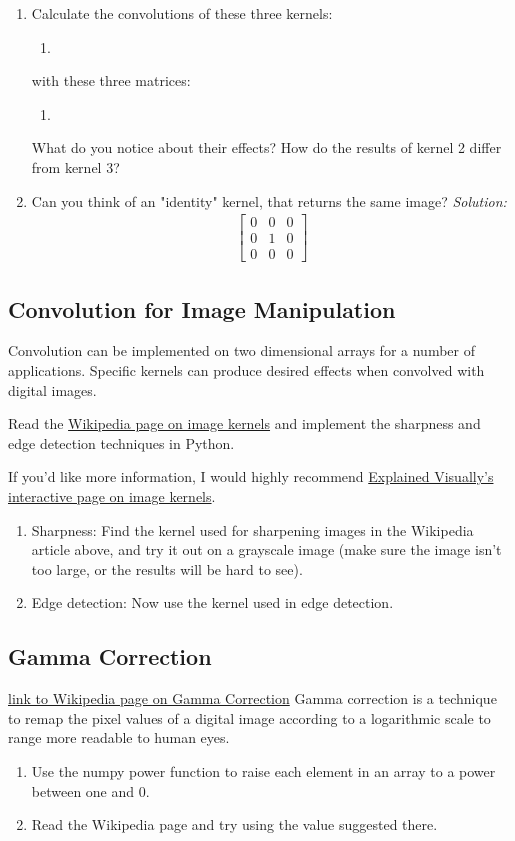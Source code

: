 \documentclass{tufte-handout}
\newcommand{\threebythree}[9]{\ensuremath{\begin{bmatrix} #1 & #2 & #3 \\ #4 & #5 & #6 \\ #7 & #8 & #9 \end{bmatrix}}}
\begin{document}
\begin{enumerate}
\item Calculate the convolutions of these three kernels:
    \begin{enumerate}
        \item
    \end{enumerate}
    with these three matrices:
    \begin{enumerate}
        \item
    \end{enumerate}
    What do you notice about their effects? How do the results of kernel 2 differ from kernel 3?
\item Can you think of an "identity" kernel, that returns the same image?
\linebreak
\emph{Solution:}
\begin{align*}
    \threebythree{0}{0}{0}{0}{1}{0}{0}{0}{0}
\end{align*}
\end{enumerate}

\subsection{Convolution for Image Manipulation}  %
Convolution can be implemented on two dimensional arrays for a number of applications. Specific kernels can produce desired effects when convolved with digital images.

Read the \href{https://en.wikipedia.org/wiki/Kernel_(image_processing)}{Wikipedia page on image kernels} and implement the sharpness and edge detection techniques in Python.

If you'd like more information, I would highly recommend \href{http://setosa.io/ev/image-kernels/}{Explained Visually's interactive page on image kernels}.

\begin{enumerate}[resume]
\item Sharpness:
Find the kernel used for sharpening images in the Wikipedia article above, and try it out on a grayscale image (make sure the image isn't too large, or the results will be hard to see).
\item Edge detection: Now use the kernel used in edge detection. 
\end{enumerate}


\subsection{Gamma Correction}  %
\href{https://en.wikipedia.org/wiki/Gamma_correction}{link to Wikipedia page on Gamma Correction}
Gamma correction is a technique to remap the pixel values of a digital image according to a logarithmic scale to range more readable to human eyes. 
\begin{enumerate}
    \item Use the numpy power function to raise each element in an array to a power between one and 0. 
    \item Read the Wikipedia page and try using the value suggested there.
\end{enumerate}
\end{document}
